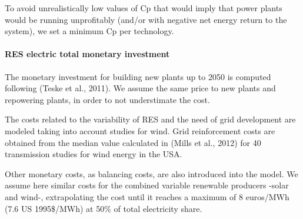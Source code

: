 To avoid unrealistically low values of Cp that would imply that power plants would be running
unprofitably (and/or with negative net energy return to the system), we set a minimum Cp per
technology.

\paragraph{RES electric total monetary investment}

The monetary investment for building new plants up to 2050 is computed following (Teske et al.,
2011). We assume the same price to new plants and repowering plants, in order to not understimate the cost. 

The costs related to the variability of RES and the need of grid development are modeled taking into account studies for wind. Grid reinforcement costs are obtained from the median value calculated in (Mills et al., 2012)  for 40 transmission studies for wind energy
in the USA.

Other monetary costs, as balancing costs, are also introduced into the model. We assume here similar costs for the combined variable
renewable producers -solar and wind-, extrapolating the cost until it reaches a maximum of 8
euros/MWh (7.6 US 1995\$/MWh) at 50\% of total electricity share.

